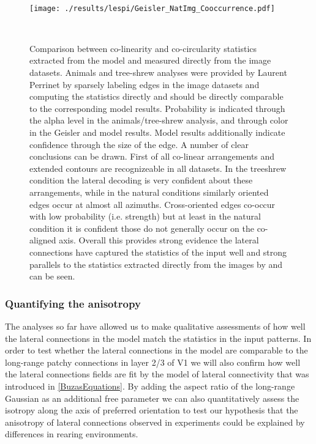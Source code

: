 \begin{figure}
  \begin{minipage}[t]{0.6\textwidth}
    \mbox{}\\[-\baselineskip]    \texttt{[image: ./results/lespi/Geisler\_NatImg\_Cooccurrence.pdf]}
  \end{minipage}\hfill
  \begin{minipage}[t]{0.35\textwidth}
    \mbox{}\\[-\baselineskip]
	\caption{Comparison between co-linearity and co-circularity
      statistics extracted from the model and measured directly from
      the image datasets. Animals and tree-shrew analyses were
      provided by Laurent Perrinet by sparsely labeling edges in the
      image datasets and computing the statistics directly and should
      be directly comparable to the corresponding model
      results. Probability is indicated through the alpha level in the
      animals/tree-shrew analysis, and through color in the Geisler
      and model results. Model results additionally indicate
      confidence through the size of the edge. A number of clear
      conclusions can be drawn. First of all co-linear arrangements
      and extended contours are recognizeable in all datasets. In the
      treeshrew condition the lateral decoding is very confident about
      these arrangements, while in the natural conditions similarly
      oriented edges occur at almost all azimuths. Cross-oriented
      edges co-occur with low probability (i.e. strength) but at least
      in the natural condition it is confident those do not generally
      occur on the co-aligned axis. Overall this provides strong
      evidence the lateral connections have captured the statistics of
      the input well and strong parallels to the statistics extracted
      directly from the images by \cite{Geisler2001} and
      \cite{Perrinet2015} can be seen.}
	\label{NatImgGeisler}
    \end{minipage}
\end{figure}

\subsubsection*{Quantifying the anisotropy}

The analyses so far have allowed us to make qualitative assessments of
how well the lateral connections in the model match the statistics in
the input patterns. In order to test whether the lateral connections
in the model are comparable to the long-range patchy connections in
layer 2/3 of V1 we will also confirm how well the lateral connections
fields are fit by the \cite{Buzas2006} model of lateral connectivity
that was introduced in \ref{BuzasEquations}. By adding the aspect
ratio of the long-range Gaussian as an additional free parameter we
can also quantitatively assess the isotropy along the axis of
preferred orientation to test our hypothesis that the anisotropy of
lateral connections observed in experiments \citep{Bosking1997} could
be explained by differences in rearing environments.

